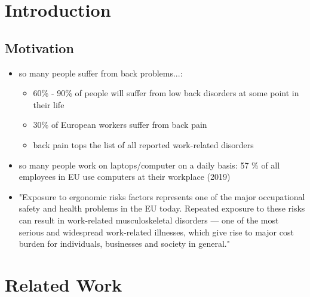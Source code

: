 \section{Introduction} %
\label{introduction}
\subsection{Motivation}
\begin{itemize}
    \item so many people suffer from back problems...: 
    \begin{itemize}
        \item 60\% - 90\% of people will suffer from low back disorders at some point in their life~\cite{osha2000facts}
        \item 30\% of European workers suffer from back pain~\cite{osha2000facts}
        \item back pain tops the list of all reported work-related disorders~\cite{osha2000facts}
    \end{itemize}
    \item so many people work on laptops/computer on a daily basis: 57 \% of all employees in EU use computers at their workplace (2019)~\cite{eurostat_comp_use}
    \item "Exposure to ergonomic risks factors represents one of the major occupational safety and health problems in the EU today. Repeated exposure to these risks can result in work-related musculoskeletal disorders — one of the most serious and widespread work-related illnesses, which give rise to major cost burden for individuals, businesses and society in general."~\cite{osha2019msd}
\end{itemize}



\section{Related Work} %
\label{related-work}

